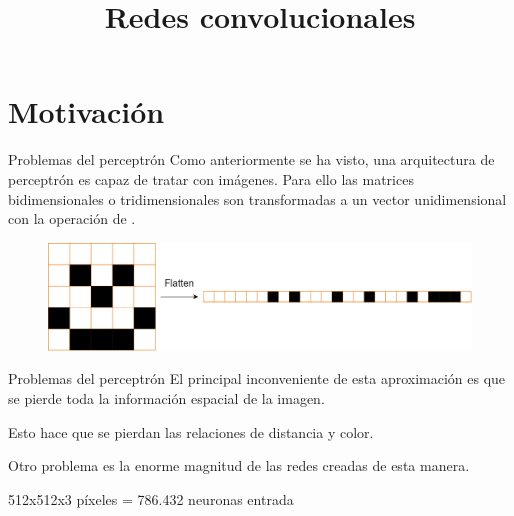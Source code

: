 



\title{Redes convolucionales}


\hypersetup{
    colorlinks=true,  %
    linkcolor=linkblue,  %
    urlcolor=linkblue,   %
    citecolor=linkblue
}

\usepackage{fontawesome5}


\maketitle

\section{Motivación}

\begin{frame}{Problemas del perceptrón}
Como anteriormente se ha visto, una arquitectura de \alert{perceptrón} es capaz de tratar con imágenes. Para ello las matrices \alert{bidimensionales} o \alert{tridimensionales} son transformadas a un vector \alert{unidimensional} con la operación de .

\begin{figure}
    \centering
    \includegraphics[width=\textwidth]{Slides/figures/Tema 3/Flatten.png}
\end{figure}
\end{frame}

\begin{frame}{Problemas del perceptrón}
El principal \alert{inconveniente} de esta aproximación es que se pierde toda la información \alert{espacial} de la imagen.

Esto hace que se pierdan las \alert{relaciones} de \alert{distancia} y \alert{color}.

Otro problema es la \alert{enorme} magnitud de las redes creadas de esta manera.

\centering
{\Large 512x512x3 píxeles = 786.432 neuronas entrada}
\end{frame}


